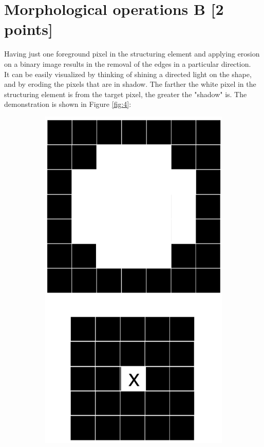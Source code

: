 \documentclass[tikz,14pt,fleqn]{article}
\begin{document}
\section{Morphological operations B [2 points]}
Having just one foreground pixel in the structuring element and applying erosion on a binary image results in the removal of the edges in a particular direction.\\
It can be easily visualized by thinking of shining a directed light on the shape, and by eroding the pixels that are in shadow. The farther the white pixel in the structuring element is from the target pixel, the greater the "shadow" is. The demonstration is shown in Figure \ref{fig:4}:
\begin{figure}[h!]
    \begin{subfigure}[b]{0.195\linewidth}
        \centering
        \includegraphics[width=\linewidth]{fig/4.er1.png}

\end{subfigure}
\end{figure}
\end{document}
